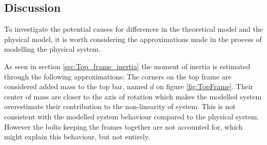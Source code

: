 \documentclass[../../Main]{subfiles}
\begin{document}
\subsection{Discussion}
\label{sec:discussion}


To investigate the potential causes for differences in  the theoretical model and the physical model, it is worth considering the approximations made in the process of modelling the physical system.

As seen in section \ref{sec:Top_frame_inertia} the moment of inertia is estimated through the following approximations: The corners on the top frame are considered added mass to the top bar, named $d$ on figure \ref{fig:TopFrame}. Their center of mass are closer to the axis of rotation which makes the modelled system overestimate their contribution to the non-linearity of system. This is not consistent with the modelled system behaviour compared to the physical system.
However the bolts keeping the frames together are not accounted for, which might explain this behaviour, but not entirely.

\end{document}
